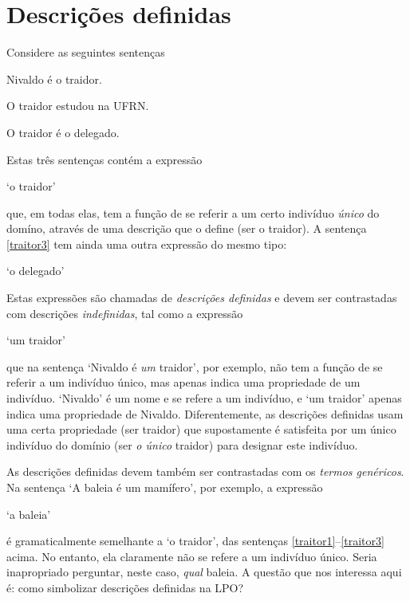 \chapter{Descrições definidas}\label{subsec.defdesc}\label{c:Desdef}
Considere as seguintes sentenças
	\begin{earg}
		\item[\ex{traitor1}] Nivaldo é o traidor.
		\item[\ex{traitor2}] O traidor estudou na UFRN.
		\item[\ex{traitor3}] O traidor é o delegado.
	\end{earg}
Estas três sentenças contém a expressão
\begin{center}
	`o traidor'
\end{center}
que, em todas elas, tem a função de se referir a um certo indivíduo \emph{único} do domíno, através de uma descrição que o define (ser o traidor).
A sentença \ref{traitor3} tem ainda uma outra expressão do mesmo tipo:
\begin{center}
	`o delegado'
\end{center}
Estas expressões são chamadas de \emph{descrições definidas} e devem ser contrastadas com descrições \emph{indefinidas}, tal como a expressão
\begin{center}
	`um traidor'
\end{center}
que na sentença `Nivaldo é \emph{um} traidor', por exemplo, não tem a função de se referir a um indivíduo único, mas apenas indica uma propriedade de um indivíduo.
`Nivaldo' é um nome e se refere a um indivíduo, e `um traidor' apenas indica uma propriedade de Nivaldo. 
Diferentemente, as descrições definidas usam uma certa propriedade (ser traidor) que supostamente é satisfeita por um único indivíduo do domínio (ser \emph{o único} traidor) para designar este indivíduo.

As descrições definidas devem também ser contrastadas com os \emph{termos genéricos}.
Na sentença `A baleia é um mamífero', por exemplo, a expressão
\begin{center}
	`a baleia'
\end{center}
é gramaticalmente semelhante a `o traidor', das sentenças \ref{traitor1}--\ref{traitor3} acima. No entanto, ela claramente não se refere a um indivíduo único.
Seria inapropriado perguntar, neste caso, \emph{qual} baleia.
A questão que nos interessa aqui é: como simbolizar descrições definidas na LPO?


